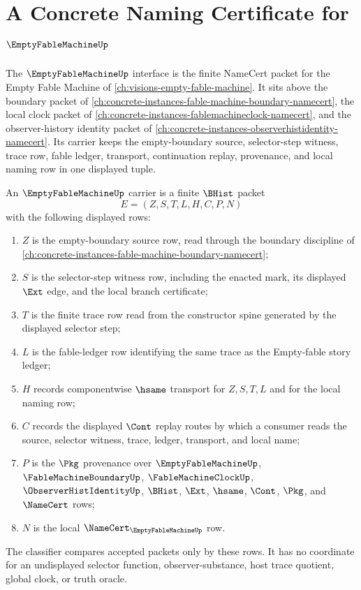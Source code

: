 \chapter{A Concrete Naming Certificate for $\EmptyFableMachineUp$}
\label{ch:concrete-instances-emptyfablemachine-namecert}

The $\EmptyFableMachineUp$ interface is the finite NameCert packet for the Empty Fable Machine of \autoref{ch:visions-empty-fable-machine}. It sits above the boundary packet of \autoref{ch:concrete-instances-fable-machine-boundary-namecert}, the local clock packet of \autoref{ch:concrete-instances-fablemachineclock-namecert}, and the observer-history identity packet of \autoref{ch:concrete-instances-observerhistidentity-namecert}. Its carrier keeps the empty-boundary source, selector-step witness, trace row, fable ledger, transport, continuation replay, provenance, and local naming row in one displayed tuple.

\begin{definition}
\label{def:empty-fable-machine-carrier}
An $\EmptyFableMachineUp$ carrier is a finite $\BHist$ packet
$$
E=(Z,S,T,L,H,C,P,N)
$$
with the following displayed rows:
\begin{enumerate}
\item $Z$ is the empty-boundary source row, read through the boundary discipline of \autoref{ch:concrete-instances-fable-machine-boundary-namecert};
\item $S$ is the selector-step witness row, including the enacted mark, its displayed $\Ext$ edge, and the local branch certificate;
\item $T$ is the finite trace row read from the constructor spine generated by the displayed selector step;
\item $L$ is the fable-ledger row identifying the same trace as the Empty-fable story ledger;
\item $H$ records componentwise $\hsame$ transport for $Z,S,T,L$ and for the local naming row;
\item $C$ records the displayed $\Cont$ replay routes by which a consumer reads the source, selector witness, trace, ledger, transport, and local name;
\item $P$ is the $\Pkg$ provenance over $\EmptyFableMachineUp$, $\FableMachineBoundaryUp$, $\FableMachineClockUp$, $\ObserverHistIdentityUp$, $\BHist$, $\Ext$, $\hsame$, $\Cont$, $\Pkg$, and $\NameCert$ rows;
\item $N$ is the local $\NameCert_{\EmptyFableMachineUp}$ row.
\end{enumerate}
The classifier compares accepted packets only by these rows. It has no coordinate for an undisplayed selector function, observer-substance, host trace quotient, global clock, or truth oracle.
\end{definition}

